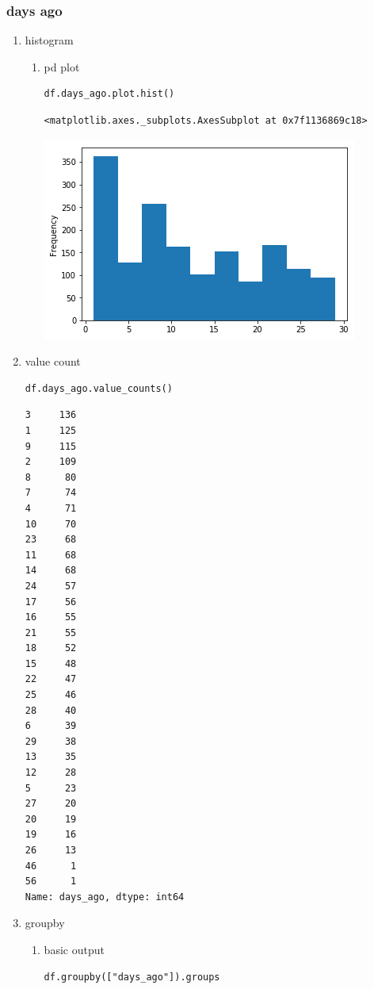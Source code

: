 \documentclass[11pt]{article}
\begin{document}
\subsubsection{days ago}
\label{sec:orgfe8b5e5}
\begin{enumerate}
\item histogram
\label{sec:org9d3db66}
\begin{enumerate}
\item pd plot
\label{sec:org9aa81fb}
\begin{verbatim}
df.days_ago.plot.hist()
\end{verbatim}

\begin{verbatim}
<matplotlib.axes._subplots.AxesSubplot at 0x7f1136869c18>
\end{verbatim}
\begin{center}
\includegraphics[width=.9\linewidth]{./obipy-resources/TtBMu6.png}
\end{center}
\end{enumerate}
\item value count
\label{sec:org82cfe96}
\begin{verbatim}
df.days_ago.value_counts()
\end{verbatim}

\begin{verbatim}
3     136
1     125
9     115
2     109
8      80
7      74
4      71
10     70
23     68
11     68
14     68
24     57
17     56
16     55
21     55
18     52
15     48
22     47
25     46
28     40
6      39
29     38
13     35
12     28
5      23
27     20
20     19
19     16
26     13
46      1
56      1
Name: days_ago, dtype: int64
\end{verbatim}
\item groupby
\label{sec:orgc07c9cd}
\begin{enumerate}
\item basic output
\label{sec:orgc48f138}
\begin{verbatim}
df.groupby(["days_ago"]).groups
\end{verbatim}


\end{enumerate}
\end{enumerate}
\end{document}
